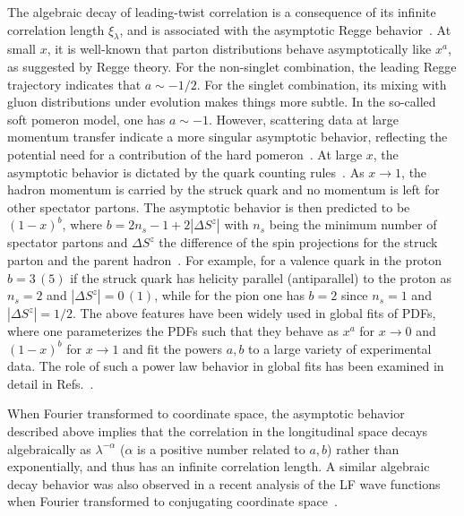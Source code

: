 The algebraic decay of leading-twist correlation is a consequence of its infinite correlation length $\xi_\lambda$, and is associated with the asymptotic Regge behavior~\cite{Regge:1959mz}. At small $x$, it is well-known that parton distributions behave asymptotically like $x^a$, as suggested by Regge theory. For the non-singlet combination, the leading Regge trajectory indicates that $a\sim-1/2$. For the singlet combination, its mixing with gluon distributions under evolution makes things more subtle. In the so-called soft pomeron model, one has $a\sim -1$. However, scattering data at large momentum transfer indicate a more singular asymptotic behavior, reflecting the potential need for a contribution of the hard pomeron~\cite{Devenish:2004pb}. At large $x$, the asymptotic behavior is dictated by the quark counting rules~\cite{Brodsky:1973kr}. As $x\to 1$, the hadron momentum is carried by the struck quark and no momentum is left for other spectator partons. The asymptotic behavior is then predicted to be $(1-x)^b$, where $b=2n_s-1+2|\Delta S^z|$ with $n_s$ being the minimum number of spectator partons and $\Delta S^z$ the difference of the spin projections for the struck parton and the parent hadron~\cite{Devenish:2004pb,Brodsky:2005wx}. For example, for a valence quark in the proton $b=3\, (5)$ if the struck quark has helicity parallel (antiparallel) to the proton as $n_s=2$ and $|\Delta S^z|= 0\, (1)$, while for the pion one has $b=2$ since $n_s=1$ and $|\Delta S^z|=1/2$. The above features have been widely used in global fits of PDFs, where one parameterizes the PDFs such that they behave as $x^a$ for $x\to 0$ and $(1-x)^b$ for $x\to 1$ and fit the powers $a, b$ to a large variety of experimental data.
The role of such a power law behavior in global fits has been examined in detail in Refs.~\cite{Ball:2016spl,Nocera:2014uea}.

When Fourier transformed to coordinate space, the asymptotic behavior described above implies that the correlation in the longitudinal space decays algebraically as $\lambda^{-\alpha}$ ($\alpha$ is a positive number related to $a, b$) rather than exponentially, and thus has an infinite correlation length. A similar algebraic decay behavior was also observed in a recent analysis of the LF wave functions~\cite{Brodsky:1997de} when Fourier transformed to conjugating coordinate space~\cite{Miller:2019ysh}.

